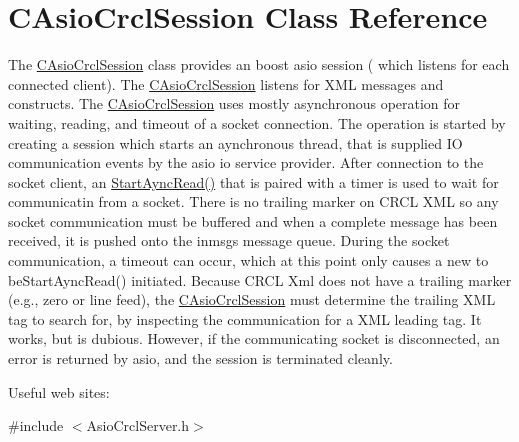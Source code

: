 \hypertarget{classCAsioCrclSession}{\section{C\-Asio\-Crcl\-Session Class Reference}
\label{classCAsioCrclSession}
}


The \hyperlink{classCAsioCrclSession}{C\-Asio\-Crcl\-Session} class provides an boost asio session ( which listens for each connected client). The \hyperlink{classCAsioCrclSession}{C\-Asio\-Crcl\-Session} listens for X\-M\-L messages and constructs. The \hyperlink{classCAsioCrclSession}{C\-Asio\-Crcl\-Session} uses mostly asynchronous operation for waiting, reading, and timeout of a socket connection. The operation is started by creating a session which starts an aynchronous thread, that is supplied I\-O communication events by the asio io service provider. After connection to the socket client, an \hyperlink{classCAsioCrclSession_ac7e0900916ab6de40bf546116d5e6d3e}{Start\-Aync\-Read()} that is paired with a timer is used to wait for communicatin from a socket. There is no trailing marker on C\-R\-C\-L X\-M\-L so any socket communication must be buffered and when a complete message has been received, it is pushed onto the inmsgs message queue. During the socket communication, a timeout can occur, which at this point only causes a new to be\-Start\-Aync\-Read() initiated. Because C\-R\-C\-L Xml does not have a trailing marker (e.\-g., zero or line feed), the \hyperlink{classCAsioCrclSession}{C\-Asio\-Crcl\-Session} must determine the trailing X\-M\-L tag to search for, by inspecting the communication for a X\-M\-L leading tag. It works, but is dubious. However, if the communicating socket is disconnected, an error is returned by asio, and the session is terminated cleanly. \par
 Useful web sites\-:  




{\ttfamily \#include $<$Asio\-Crcl\-Server.\-h$>$}

